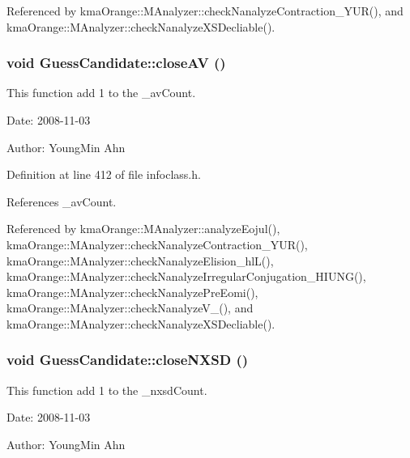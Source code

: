 Referenced by kmaOrange::MAnalyzer::checkNanalyzeContraction\_\-YUR(), and kmaOrange::MAnalyzer::checkNanalyzeXSDecliable().\hypertarget{classGuessCandidate_025f96e44f9a728833e5f2c102155dea}{
\subsubsection[{closeAV}]{\setlength{\rightskip}{0pt plus 5cm}void GuessCandidate::closeAV ()}}
\label{classGuessCandidate_025f96e44f9a728833e5f2c102155dea}


This function add 1 to the \_\-avCount. 

\begin{Desc}
\item[Date:]2008-11-03 \end{Desc}
\begin{Desc}
\item[Author:]YoungMin Ahn \end{Desc}


Definition at line 412 of file infoclass.h.

References \_\-avCount.

Referenced by kmaOrange::MAnalyzer::analyzeEojul(), kmaOrange::MAnalyzer::checkNanalyzeContraction\_\-YUR(), kmaOrange::MAnalyzer::checkNanalyzeElision\_\-hlL(), kmaOrange::MAnalyzer::checkNanalyzeIrregularConjugation\_\-HIUNG(), kmaOrange::MAnalyzer::checkNanalyzePreEomi(), kmaOrange::MAnalyzer::checkNanalyzeV\_\-(), and kmaOrange::MAnalyzer::checkNanalyzeXSDecliable().\hypertarget{classGuessCandidate_bec22d1a1868988a906fd07c7083e927}{
\subsubsection[{closeNXSD}]{\setlength{\rightskip}{0pt plus 5cm}void GuessCandidate::closeNXSD ()}}
\label{classGuessCandidate_bec22d1a1868988a906fd07c7083e927}


This function add 1 to the \_\-nxsdCount. 

\begin{Desc}
\item[Date:]2008-11-03 \end{Desc}
\begin{Desc}
\item[Author:]YoungMin Ahn \end{Desc}


